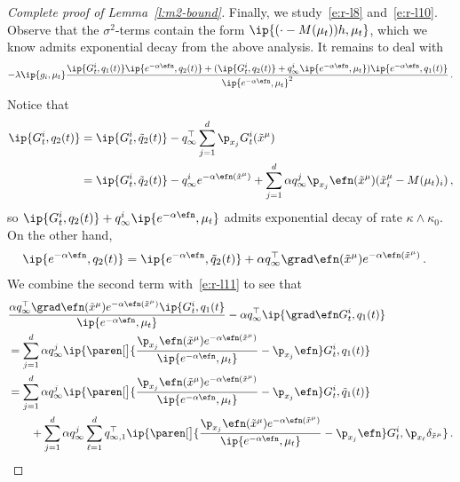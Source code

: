 \documentclass{amsart}
\begin{document}
\begin{proof}[Complete proof of Lemma~\ref{l:m2-bound}]
    Finally, we study~\eqref{e:r-l8} and~\eqref{e:r-l10}.
    Observe that the $\sigma^2$-terms contain the form $\ip{(\cdot-M(\mu_t)) h, \mu_t}$, which we know admits exponential decay from the above analysis. 
    It remains to deal with 
    \begin{align*}
        -\lambda \ip{g_i, \mu_t} \frac{ \ip{G_t^i, q_1(t)} \ip{e^{-\alpha\efn}, q_2(t)} + (\ip{G_t^i, q_2(t)} + q_{\infty}^i \ip{e^{-\alpha\efn}, \mu_t}) \ip{e^{-\alpha\efn}, q_1(t)} }{\ip{e^{-\alpha\efn}, \mu_t}^2} \,.
    \end{align*}
    Notice that 
    \begin{align*}
        \ip{G_t^i, q_2(t)} & = \ip{G_t^i, \tilde q_2(t)} - q_\infty^\top \sum_{j=1}^d \p_{x_j} G_t^i(\tilde x^\mu) \\
        & = \ip{G_t^i, \tilde q_2(t)} - q_{\infty}^i e^{-\alpha\efn(\tilde x^\mu)} + \sum_{j=1}^d \alpha q_\infty^j \p_{x_j} \efn(\tilde x^\mu) (\tilde x^\mu_i - M(\mu_t)_i) \,,
    \end{align*}
    so $\ip{G_t^i, q_2(t)} + q_{\infty}^i \ip{e^{-\alpha\efn}, \mu_t}$ admits exponential decay of rate $\kappa \land \kappa_0$. 
    On the other hand, 
    \begin{align*}
        \ip{e^{-\alpha\efn}, q_2(t)} & = \ip{e^{-\alpha\efn}, \tilde q_2(t)} + \alpha q_{\infty}^\top \grad \efn(\tilde x^\mu) e^{-\alpha \efn(\tilde x^\mu)} \,.
    \end{align*}
    We combine the second term with~\eqref{e:r-l11} to see that 
    \begin{align*}
        & \frac{\alpha q_\infty^\top \grad \efn(\tilde x^\mu) e^{-\alpha\efn(\tilde x^\mu)} \ip{G_t^i, q_1(t}}{\ip{e^{-\alpha\efn}, \mu_t}} - \alpha q_\infty^\top \ip{\grad \efn G_t^i, q_1(t)} \\
        & = \sum_{j=1}^d \alpha q_\infty^j \ip{ \paren[\big]{ \frac{\p_{x_j} \efn(\tilde x^\mu) e^{-\alpha \efn(\tilde x^\mu)}}{\ip{e^{-\alpha\efn}, \mu_t}} - \p_{x_j} \efn} G_t^i, q_1(t) } \\
        & = \sum_{j=1}^d \alpha q_\infty^j \ip{ \paren[\big]{ \frac{\p_{x_j} \efn(\tilde x^\mu) e^{-\alpha \efn(\tilde x^\mu)}}{\ip{e^{-\alpha\efn}, \mu_t}} - \p_{x_j} \efn} G_t^i, \tilde q_1(t) } \\
        & \qquad + \sum_{j=1}^d \alpha q_\infty^j \sum_{\ell=1}^d q_{\infty,1}^\top \ip{ \paren[\big]{ \frac{\p_{x_j} \efn(\tilde x^\mu) e^{-\alpha \efn(\tilde x^\mu)}}{\ip{e^{-\alpha\efn}, \mu_t}} - \p_{x_j} \efn} G_t^i, \p_{x_\ell} \delta_{\tilde x^\mu}} \,.
    \end{align*}

\end{proof}
\end{document}
